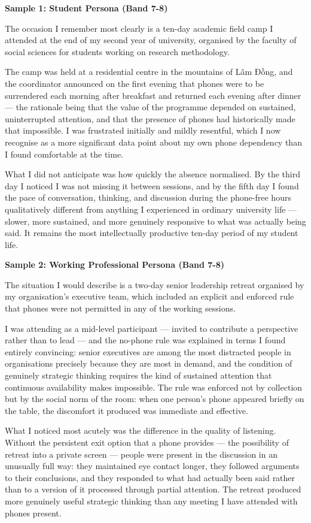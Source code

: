 \begin{ieltsanswer}
\textbf{Sample 1: Student Persona (Band 7-8)}

The occasion I remember most clearly is a ten-day academic field camp I attended at the end of my second year of university, organised by the faculty of social sciences for students working on research methodology.

The camp was held at a residential centre in the mountains of Lâm Đồng, and the coordinator announced on the first evening that phones were to be surrendered each morning after breakfast and returned each evening after dinner — the rationale being that the value of the programme depended on sustained, uninterrupted attention, and that the presence of phones had historically made that impossible. I was frustrated initially and mildly resentful, which I now recognise as a more significant data point about my own phone dependency than I found comfortable at the time.

What I did not anticipate was how quickly the absence normalised. By the third day I noticed I was not missing it between sessions, and by the fifth day I found the pace of conversation, thinking, and discussion during the phone-free hours qualitatively different from anything I experienced in ordinary university life — slower, more sustained, and more genuinely responsive to what was actually being said. It remains the most intellectually productive ten-day period of my student life.

\textbf{Sample 2: Working Professional Persona (Band 7-8)}

The situation I would describe is a two-day senior leadership retreat organised by my organisation's executive team, which included an explicit and enforced rule that phones were not permitted in any of the working sessions.

I was attending as a mid-level participant — invited to contribute a perspective rather than to lead — and the no-phone rule was explained in terms I found entirely convincing: senior executives are among the most distracted people in organisations precisely because they are most in demand, and the condition of genuinely strategic thinking requires the kind of sustained attention that continuous availability makes impossible. The rule was enforced not by collection but by the social norm of the room: when one person's phone appeared briefly on the table, the discomfort it produced was immediate and effective.

What I noticed most acutely was the difference in the quality of listening. Without the persistent exit option that a phone provides — the possibility of retreat into a private screen — people were present in the discussion in an unusually full way: they maintained eye contact longer, they followed arguments to their conclusions, and they responded to what had actually been said rather than to a version of it processed through partial attention. The retreat produced more genuinely useful strategic thinking than any meeting I have attended with phones present.
\end{ieltsanswer}


